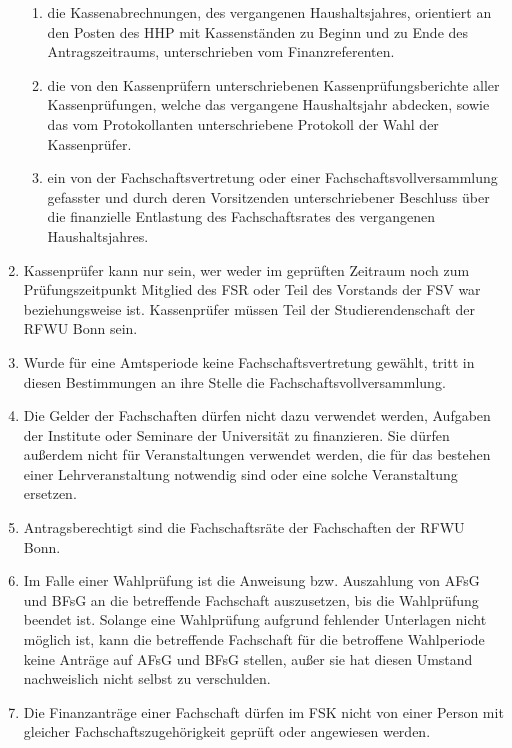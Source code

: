 \documentclass{article}
\begin{document}
\begin{enumerate}[(1)]
\begin{enumerate}[1.]
        \item die Kassenabrechnungen, des vergangenen Haushaltsjahres, orientiert an den Posten des HHP mit Kassenständen zu Beginn und zu Ende des Antragszeitraums, unterschrieben vom Finanzreferenten.
        \item die von den Kassenprüfern unterschriebenen Kassenprüfungsberichte aller Kassenprüfungen, welche das vergangene Haushaltsjahr abdecken, sowie das vom Protokollanten unterschriebene Protokoll der Wahl der Kassenprüfer.
        \item ein von der Fachschaftsvertretung oder einer Fachschaftsvollversammlung gefasster und durch deren Vorsitzenden unterschriebener Beschluss über die finanzielle  Entlastung des Fachschaftsrates des vergangenen Haushaltsjahres.
    \end{enumerate}
    \item Kassenprüfer kann nur sein, wer weder im geprüften Zeitraum noch zum Prüfungszeitpunkt Mitglied des FSR oder Teil des Vorstands der FSV war beziehungsweise ist.
    	Kassenprüfer müssen Teil der Studierendenschaft der RFWU Bonn sein.
    \item Wurde für eine Amtsperiode keine Fachschaftsvertretung gewählt, tritt in diesen Bestimmungen an ihre Stelle die Fachschaftsvollversammlung.
    \item Die Gelder der Fachschaften dürfen nicht dazu verwendet werden, Aufgaben der Institute oder Seminare der Universität zu finanzieren. 
    	Sie dürfen außerdem nicht für Veranstaltungen verwendet werden, die für das bestehen einer Lehrveranstaltung notwendig sind oder eine solche Veranstaltung ersetzen.
    \item Antragsberechtigt sind die Fachschaftsräte der Fachschaften der RFWU Bonn.
    \item Im Falle einer Wahlprüfung ist die Anweisung bzw. Auszahlung von AFsG und BFsG an die betreffende Fachschaft auszusetzen, bis die Wahlprüfung beendet ist. 
    	Solange eine Wahlprüfung aufgrund fehlender Unterlagen nicht möglich ist, kann die betreffende Fachschaft für die betroffene Wahlperiode keine Anträge auf AFsG und BFsG stellen, außer sie hat diesen Umstand nachweislich nicht selbst zu verschulden.
    \item Die Finanzanträge einer Fachschaft dürfen im FSK nicht von einer Person mit gleicher Fachschaftszugehörigkeit geprüft oder angewiesen werden.

\end{enumerate}
\end{document}
